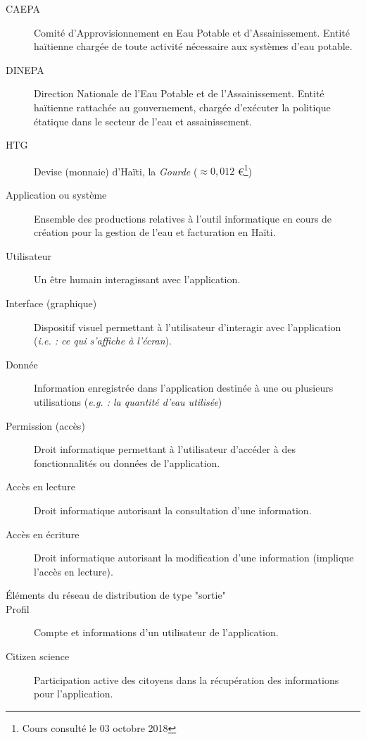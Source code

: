 \documentclass[a4paper, 11pt]{article}
\begin{document}
  \begin{description} %
    \item[CAEPA] Comité d'Approvisionnement en Eau Potable et d'Assainissement. Entité haïtienne chargée de toute activité nécessaire aux systèmes d'eau potable.
    \item[DINEPA] Direction Nationale de l'Eau Potable et de l'Assainissement. Entité haïtienne rattachée au gouvernement, chargée d'exécuter la politique étatique dans le secteur de l'eau et assainissement.
    \item[HTG] Devise (monnaie) d'Haïti, la \emph{Gourde} ($\approx 0,012$ \euro \footnote{Cours consulté le 03 octobre 2018})
    \item[Application ou système] Ensemble des productions relatives à l'outil informatique en cours de création pour la gestion de l'eau et facturation en Haïti.
    \item[Utilisateur] Un être humain interagissant avec l'application.
    \item[Interface (graphique)] Dispositif visuel permettant à l'utilisateur d'interagir avec l'application (\emph{i.e. : ce qui s'affiche à l'écran}).
    \item[Donnée] Information enregistrée dans l'application destinée à une ou plusieurs utilisations (\emph{e.g. : la quantité d'eau utilisée})
    \item[Permission (accès)] Droit informatique permettant à l'utilisateur d'accéder à des fonctionnalités ou données de l'application.
    \item[Accès en lecture] Droit informatique autorisant la consultation d'une information.
    \item[Accès en écriture] Droit informatique autorisant la modification d'une information (implique l'accès en lecture).
    \item[Éléments du réseau de distribution de type "sortie"] %
    \item[Profil] Compte et informations d'un utilisateur de l'application.
    \item[Citizen science] Participation active des citoyens dans la récupération des informations pour l'application.

\end{description}
\end{document}
